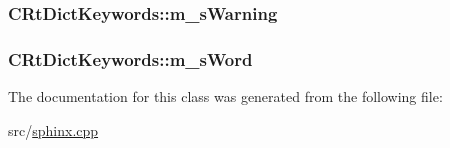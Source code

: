 \hypertarget{classCRtDictKeywords_ae318e9d3073da6b072a78ca72b06d2e5}{
\subsubsection[{m\-\_\-s\-Warning}]{ C\-Rt\-Dict\-Keywords\-::m\-\_\-s\-Warning\hspace{0.3cm}{\ttfamily [private]}}}\label{classCRtDictKeywords_ae318e9d3073da6b072a78ca72b06d2e5}
\hypertarget{classCRtDictKeywords_a834c592176bd91130cf0b398a82d6404}{
\subsubsection[{m\-\_\-s\-Word}]{ C\-Rt\-Dict\-Keywords\-::m\-\_\-s\-Word\hspace{0.3cm}{\ttfamily [private]}}}\label{classCRtDictKeywords_a834c592176bd91130cf0b398a82d6404}


The documentation for this class was generated from the following file\-:\begin{DoxyCompactItemize}
\item 
src/\hyperlink{sphinx_8cpp}{sphinx.\-cpp}\end{DoxyCompactItemize}
